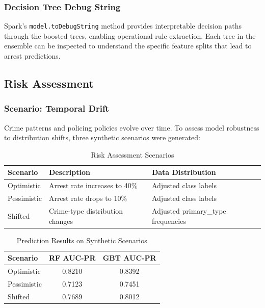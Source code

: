 \subsubsection{Decision Tree Debug String}

Spark's \texttt{model.toDebugString} method provides interpretable decision paths through the boosted trees, enabling operational rule extraction. Each tree in the ensemble can be inspected to understand the specific feature splits that lead to arrest predictions.

\subsection{Risk Assessment}

\subsubsection{Scenario: Temporal Drift}

Crime patterns and policing policies evolve over time. To assess model robustness to distribution shifts, three synthetic scenarios were generated:

\begin{table}[H]
\centering
\caption{Risk Assessment Scenarios}
\label{tab:risk-scenarios}
\begin{tabular}{lll}
\toprule
\textbf{Scenario} & \textbf{Description} & \textbf{Data Distribution} \\
\midrule
Optimistic & Arrest rate increases to 40\% & Adjusted class labels \\
Pessimistic & Arrest rate drops to 10\% & Adjusted class labels \\
Shifted & Crime-type distribution changes & Adjusted primary\_type frequencies \\
\bottomrule
\end{tabular}
\end{table}

\begin{table}[H]
\centering
\caption{Prediction Results on Synthetic Scenarios}
\label{tab:risk-results}
\begin{tabular}{lcc}
\toprule
\textbf{Scenario} & \textbf{RF AUC-PR} & \textbf{GBT AUC-PR} \\
\midrule
Optimistic & 0.8210 & 0.8392 \\
Pessimistic & 0.7123 & 0.7451 \\
Shifted & 0.7689 & 0.8012 \\
\bottomrule
\end{tabular}
\end{table}

